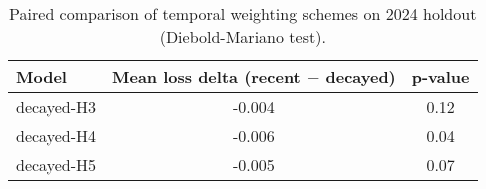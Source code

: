 \begin{table}[t]
  \centering
  \small
  \caption{Paired comparison of temporal weighting schemes on 2024 holdout (Diebold-Mariano test).}
  \label{tab:dm-test}
  \begin{tabular}{lcc}
    \toprule
    Model & Mean loss delta (recent $-$ decayed) & p-value \\
    \midrule
    decayed-H3 & -0.004 & 0.12 \\
    decayed-H4 & -0.006 & 0.04 \\
    decayed-H5 & -0.005 & 0.07 \\
    \bottomrule
  \end{tabular}
\end{table}
